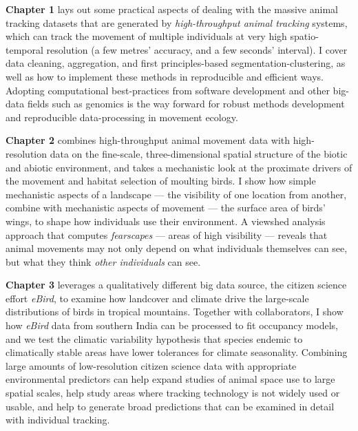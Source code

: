 \noindent \textbf{Chapter 1} lays out some practical aspects of dealing with the massive animal tracking datasets that are generated by \textit{high-throughput animal tracking} systems, which can track the movement of multiple individuals at very high spatio-temporal resolution (a few metres' accuracy, and a few seconds' interval).
I cover data cleaning, aggregation, and first principles-based segmentation-clustering, as well as how to implement these methods in reproducible and efficient ways.
Adopting computational best-practices from software development and other big-data fields such as genomics is the way forward for robust methods development and reproducible data-processing in movement ecology.

\medskip

\noindent \textbf{Chapter 2} combines high-throughput animal movement data with high-resolution data on the fine-scale, three-dimensional spatial structure of the biotic and abiotic environment, and takes a mechanistic look at the proximate drivers of the movement and habitat selection of moulting birds.
I show how simple mechanistic aspects of a landscape --- the visibility of one location from another, combine with mechanistic aspects of movement --- the surface area of birds' wings, to shape how individuals use their environment.
A viewshed analysis approach that computes \textit{fearscapes} --- areas of high visibility --- reveals that animal movements may not only depend on what individuals themselves can see, but what they think \textit{other individuals} can see.

\medskip

\noindent \textbf{Chapter 3} leverages a qualitatively different big data source, the citizen science effort \textit{eBird}, to examine how landcover and climate drive the large-scale distributions of birds in tropical mountains.
Together with collaborators, I show how \textit{eBird} data from southern India can be processed to fit occupancy models, and we test the climatic variability hypothesis that species endemic to climatically stable areas have lower tolerances for climate seasonality.
Combining large amounts of low-resolution citizen science data with appropriate environmental predictors can help expand studies of animal space use to large spatial scales, help study areas where tracking technology is not widely used or usable, and help to generate broad predictions that can be examined in detail with individual tracking.

\medskip

